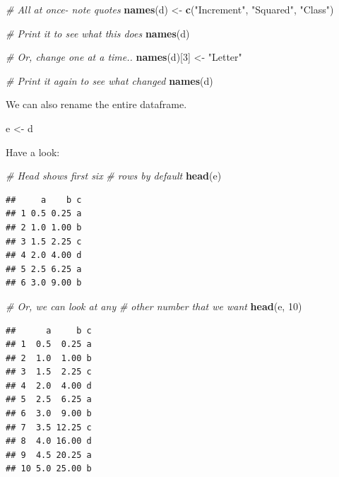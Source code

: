 \documentclass[
]{book}
\newenvironment{Shaded}{\begin{snugshade}}{\end{snugshade}}
\newcommand{\CommentTok}[1]{\textcolor[rgb]{0.56,0.35,0.01}{\textit{#1}}}
\newcommand{\DecValTok}[1]{\textcolor[rgb]{0.00,0.00,0.81}{#1}}
\newcommand{\KeywordTok}[1]{\textcolor[rgb]{0.13,0.29,0.53}{\textbf{#1}}}
\newcommand{\NormalTok}[1]{#1}
\newcommand{\StringTok}[1]{\textcolor[rgb]{0.31,0.60,0.02}{#1}}
\begin{document}
\begin{Shaded}
\begin{Highlighting}[]
\CommentTok{# All at once- note quotes}
\KeywordTok{names}\NormalTok{(d) <-}\StringTok{ }\KeywordTok{c}\NormalTok{(}\StringTok{"Increment"}\NormalTok{, }\StringTok{"Squared"}\NormalTok{, }\StringTok{"Class"}\NormalTok{)}

\CommentTok{# Print it to see what this does}
\KeywordTok{names}\NormalTok{(d)}

\CommentTok{# Or, change one at a time..}
\KeywordTok{names}\NormalTok{(d)[}\DecValTok{3}\NormalTok{] <-}\StringTok{ "Letter"}

\CommentTok{# Print it again to see what changed}
\KeywordTok{names}\NormalTok{(d)}
\end{Highlighting}
\end{Shaded}

We can also rename the entire dataframe.

\begin{Shaded}
\begin{Highlighting}[]
\NormalTok{e <-}\StringTok{ }\NormalTok{d}
\end{Highlighting}
\end{Shaded}

Have a look:

\begin{Shaded}
\begin{Highlighting}[]
\CommentTok{# Head shows first six}
\CommentTok{# rows by default}
\KeywordTok{head}\NormalTok{(e)}
\end{Highlighting}
\end{Shaded}

\begin{verbatim}
##     a    b c
## 1 0.5 0.25 a
## 2 1.0 1.00 b
## 3 1.5 2.25 c
## 4 2.0 4.00 d
## 5 2.5 6.25 a
## 6 3.0 9.00 b
\end{verbatim}

\begin{Shaded}
\begin{Highlighting}[]
\CommentTok{# Or, we can look at any}
\CommentTok{# other number that we want}
\KeywordTok{head}\NormalTok{(e, }\DecValTok{10}\NormalTok{)}
\end{Highlighting}
\end{Shaded}

\begin{verbatim}
##      a     b c
## 1  0.5  0.25 a
## 2  1.0  1.00 b
## 3  1.5  2.25 c
## 4  2.0  4.00 d
## 5  2.5  6.25 a
## 6  3.0  9.00 b
## 7  3.5 12.25 c
## 8  4.0 16.00 d
## 9  4.5 20.25 a
## 10 5.0 25.00 b
\end{verbatim}
\end{document}
